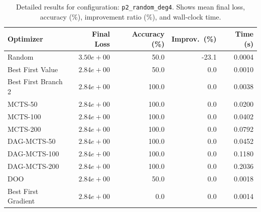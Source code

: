 \begin{table}[H]
\centering
\caption{Detailed results for configuration: \texttt{p2\_random\_deg4}. Shows mean final loss, accuracy (\%), improvement ratio (\%), and wall-clock time.}
\label{tab:funclearn-detail-9}
\begin{tabular}{lrrrr}
\toprule
Optimizer & Final Loss & Accuracy (\%) & Improv.~(\%) & Time (s) \\
\midrule
Random & $3.50e+00$ & 50.0 & -23.1 & 0.0004 \\
\hline
Best First Value & \textbf{$2.84e+00$} & 50.0 & 0.0 & 0.0010 \\
\hline
Best First Branch 2 & \textbf{$2.84e+00$} & 100.0 & 0.0 & 0.0038 \\
\hline
MCTS-50 & \textbf{$2.84e+00$} & 100.0 & 0.0 & 0.0200 \\
\hline
MCTS-100 & \textbf{$2.84e+00$} & 100.0 & 0.0 & 0.0402 \\
\hline
MCTS-200 & \textbf{$2.84e+00$} & 100.0 & 0.0 & 0.0792 \\
\hline
DAG-MCTS-50 & \textbf{$2.84e+00$} & 100.0 & 0.0 & 0.0452 \\
\hline
DAG-MCTS-100 & \textbf{$2.84e+00$} & 100.0 & 0.0 & 0.1180 \\
\hline
DAG-MCTS-200 & \textbf{$2.84e+00$} & 100.0 & 0.0 & 0.2036 \\
\hline
DOO & \textbf{$2.84e+00$} & 50.0 & 0.0 & 0.0018 \\
\hline
Best First Gradient & \textbf{$2.84e+00$} & 0.0 & 0.0 & 0.0014 \\
\bottomrule
\end{tabular}
\end{table}

